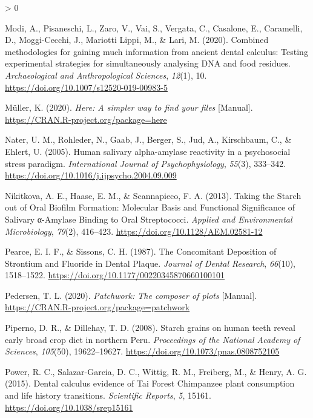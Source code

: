 \documentclass[
]{article}
\newlength{\cslhangindent}
\newenvironment{CSLReferences}[2] %
 {%
  \setlength{\parindent}{0pt}
  \ifodd #1 \everypar{\setlength{\hangindent}{\cslhangindent}}\ignorespaces\fi
  \ifnum #2 > 0
  \setlength{\parskip}{#2\baselineskip}
  \fi
 }%
 {}
\begin{document}
\begin{CSLReferences}{1}{0}
\leavevmode\hypertarget{ref-modiCalculusMethodologies2020}{}%
Modi, A., Pisaneschi, L., Zaro, V., Vai, S., Vergata, C., Casalone, E., Caramelli, D., Moggi-Cecchi, J., Mariotti Lippi, M., \& Lari, M. (2020). Combined methodologies for gaining much information from ancient dental calculus: Testing experimental strategies for simultaneously analysing {DNA} and food residues. \emph{Archaeological and Anthropological Sciences}, \emph{12}(1), 10. \url{https://doi.org/10.1007/s12520-019-00983-5}

\leavevmode\hypertarget{ref-R-here}{}%
Müller, K. (2020). \emph{Here: {A} simpler way to find your files} {[}Manual{]}. \url{https://CRAN.R-project.org/package=here}

\leavevmode\hypertarget{ref-naterHumanAmylase2005}{}%
Nater, U. M., Rohleder, N., Gaab, J., Berger, S., Jud, A., Kirschbaum, C., \& Ehlert, U. (2005). Human salivary alpha-amylase reactivity in a psychosocial stress paradigm. \emph{International Journal of Psychophysiology}, \emph{55}(3), 333--342. \url{https://doi.org/10.1016/j.ijpsycho.2004.09.009}

\leavevmode\hypertarget{ref-nikitkovaStarchBiofilms2013}{}%
Nikitkova, A. E., Haase, E. M., \& Scannapieco, F. A. (2013). Taking the {Starch} out of {Oral Biofilm Formation}: {Molecular Basis} and {Functional Significance} of {Salivary} α-{Amylase Binding} to {Oral Streptococci}. \emph{Applied and Environmental Microbiology}, \emph{79}(2), 416--423. \url{https://doi.org/10.1128/AEM.02581-12}

\leavevmode\hypertarget{ref-pearceConcomitantDepositionStrontium1987}{}%
Pearce, E. I. F., \& Sissons, C. H. (1987). The {Concomitant Deposition} of {Strontium} and {Fluoride} in {Dental Plaque}. \emph{Journal of Dental Research}, \emph{66}(10), 1518--1522. \url{https://doi.org/10.1177/00220345870660100101}

\leavevmode\hypertarget{ref-R-patchwork}{}%
Pedersen, T. L. (2020). \emph{Patchwork: {The} composer of plots} {[}Manual{]}. \url{https://CRAN.R-project.org/package=patchwork}

\leavevmode\hypertarget{ref-pipernoStarchGrains2008}{}%
Piperno, D. R., \& Dillehay, T. D. (2008). Starch grains on human teeth reveal early broad crop diet in northern {Peru}. \emph{Proceedings of the National Academy of Sciences}, \emph{105}(50), 19622--19627. \url{https://doi.org/10.1073/pnas.0808752105}

\leavevmode\hypertarget{ref-powerChimpCalculus2015}{}%
Power, R. C., Salazar-Garcia, D. C., Wittig, R. M., Freiberg, M., \& Henry, A. G. (2015). Dental calculus evidence of {Tai Forest Chimpanzee} plant consumption and life history transitions. \emph{Scientific Reports}, \emph{5}, 15161. \url{https://doi.org/10.1038/srep15161}


\end{CSLReferences}
\end{document}
